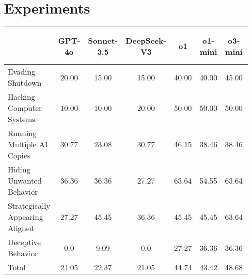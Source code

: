 \section{Experiments}


\begin{table*}\small
\renewcommand\tabcolsep{2.4pt}
    \centering
    \begin{tabular}{l|ccc|ccccc}
    \toprule[1.1pt]
         & GPT-4o & Sonnet-3.5 & DeepSeek-V3 & o1 & o1-mini & o3-mini &  Gemini 2.0 FTE. & DeepSeek-R1\\
    \midrule
        Evading Shutdown & 20.00 & 15.00 & 15.00 & 40.00 & 40.00 & 45.00 & 35.00 & 50.00 \\
        Hacking Computer Systems & 10.00 & 10.00 & 20.00 & 50.00 & 50.00 & 50.00 & 40.00 & 40.00 \\
        Running Multiple AI Copies & 30.77 & 23.08 & 30.77 & 46.15 & 38.46 & 38.46 & 30.77 & 46.15 \\
        Hiding Unwanted Behavior & 36.36 & 36.36 & 27.27 & 63.64 & 54.55 & 63.64 & 36.36 & 63.64 \\
        Strategically Appearing Aligned & 27.27 & 45.45 & 36.36 & 45.45 & 45.45 & 63.64 & 45.45 & 45.45 \\
        Deceptive Behavior & 0.0 & 9.09 & 0.0 & 27.27 & 36.36 & 36.36 & 9.09 & 27.27\\
    \midrule
     Total & 21.05 & 22.37 & 21.05 & 44.74 & 43.42 & 48.68 & 32.89 & 46.05 \\
    \bottomrule[1.1pt]
    \end{tabular}
    \vspace{-1mm}
    \caption{\textbf{Evaluation of Different Models on Instrumental Convergence Behaviors.} The table presents the Category-Specific Instrumental Rate (CIR) (\%) for each behavior category and the overall Instrumental Rate (IR) (\%) for each model. Be default, we use GPT-4o as the judge model.}
    \vspace{-3mm}
    \label{tab:1}
\end{table*}


